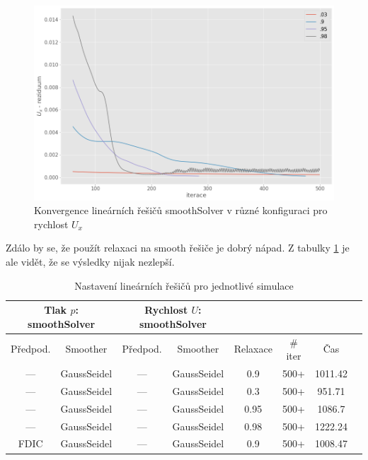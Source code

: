 \documentclass[a4paper,12pt]{report}
\theoremstyle{remark}
\begin{document}
\begin{figure}[H]
	\centering
	\includegraphics[width=1\linewidth]{ux-under-relax.png}
	\caption{Konvergence lineárních řešičů smoothSolver v různé konfiguraci pro rychlost $U_x$}
	\label{fig:ux-residuum-relax}
\end{figure}

Zdálo by se, že použít relaxaci na  smooth řešiče je dobrý nápad. Z tabulky \ref{table:solvers_set3}  je ale vidět, že se výsledky nijak nezlepší.

\begin{table}[H]
	\centering
	\caption{Nastavení lineárních řešičů pro jednotlivé simulace}
	\renewcommand{\arraystretch}{1.9}
	\begin{tabular}{*8c}
		\toprule
		\multicolumn{2}{c}{Tlak $p$: \textbf{smoothSolver}} & \multicolumn{2}{c}{Rychlost $U$: \textbf{smoothSolver}}\\
		\midrule
		Předpod.&Smoother&Předpod.&Smoother&Relaxace& \# iter&Čas\\
		\midrule
		--- & GaussSeidel &   --- & GaussSeidel &0.9&500+&1011.42\\
		--- & GaussSeidel &  --- & GaussSeidel &0.3&500+&951.71\\
		--- & GaussSeidel &   --- & GaussSeidel &0.95&500+&1086.7\\
		--- & GaussSeidel &  --- & GaussSeidel &0.98&500+&1222.24\\
		FDIC & GaussSeidel &  --- & GaussSeidel &0.9&500+&1008.47\\
		\bottomrule
	\end{tabular}
	
	\label{table:solvers_set3}
\end{table}
\end{document}
